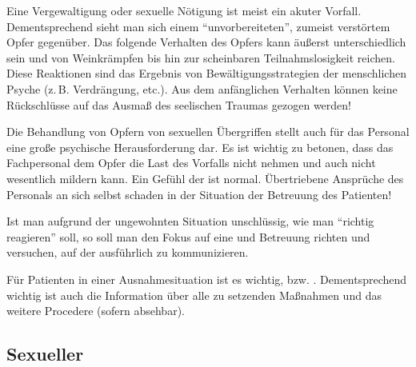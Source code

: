 

{Eine Vergewaltigung oder sexuelle Nötigung ist meist ein
akuter Vorfall. Dementsprechend sieht man sich einem
\enquote{unvorbereiteten}, zumeist verstörtem Opfer gegenüber. Das
folgende Verhalten des Opfers kann äußerst unterschiedlich
sein und von Weinkrämpfen bis hin zur scheinbaren
Teilnahmslosigkeit reichen. Diese Reaktionen sind das
Ergebnis von Bewältigungsstrategien der menschlichen Psyche
(z.\,B. Verdrängung, etc.).
 Aus dem anfänglichen Verhalten können keine
Rückschlüsse auf das Ausmaß des seelischen Traumas
gezogen werden!}
{}
{}
{}
{}



{Die Behandlung von Opfern von sexuellen Übergriffen stellt
auch für das Personal eine große psychische Herausforderung
dar. Es ist wichtig zu betonen, dass das Fachpersonal dem
Opfer die Last des Vorfalls nicht nehmen und auch nicht
wesentlich mildern kann. Ein Gefühl der  ist normal. Übertriebene Ansprüche des
Personals an sich selbst schaden in der Situation der
Betreuung des Patienten!
}
{}
{}
{}
{}

{Ist man aufgrund der ungewohnten Situation unschlüssig, wie
man \enquote{richtig reagieren} soll, so soll man den Fokus auf
eine  und  Betreuung richten und
versuchen, auf der  ausführlich zu
kommunizieren. 

Für Patienten in einer Ausnahmesituation ist es wichtig,
 bzw.
. Dementsprechend wichtig
ist auch die Information über alle zu setzenden 
Maßnahmen und das weitere Procedere (sofern absehbar). }
{}
{}
{}
{}






\subsection{Sexueller }

